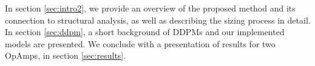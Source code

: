 \documentclass[conference]{IEEEtran}
\begin{document}
 	In section \ref{sec:intro2}, we provide an overview of the proposed method and its connection to structural analysis, as well as describing the sizing process in detail. In section \ref{sec:ddpm}, a short background of DDPMs and our implemented models are presented. We conclude with a presentation of results for two OpAmps, in section \ref{sec:results}.
	
%
\end{document}
